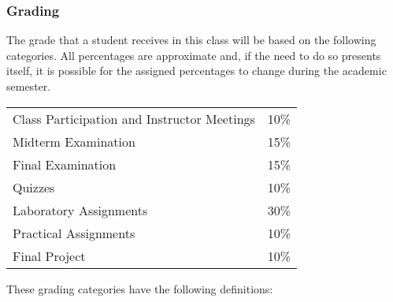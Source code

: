 \subsubsection*{Grading}

The grade that a student receives in this class will be based on the following categories. All percentages are
approximate and, if the need to do so presents itself, it is possible for the assigned percentages to change during the
academic semester.

\begin{center}
  \begin{tabular}{ll}
    Class Participation and Instructor Meetings & 10\% \\
    Midterm Examination                         & 15\% \\
    Final Examination                           & 15\% \\
    Quizzes                                     & 10\% \\
    Laboratory Assignments                      & 30\% \\
    Practical Assignments                       & 10\% \\
    Final Project                               & 10\%
  \end{tabular}
\end{center}

\vspace*{-.1in}
\noindent
These grading categories have the following definitions:
\vspace*{-.1in}

